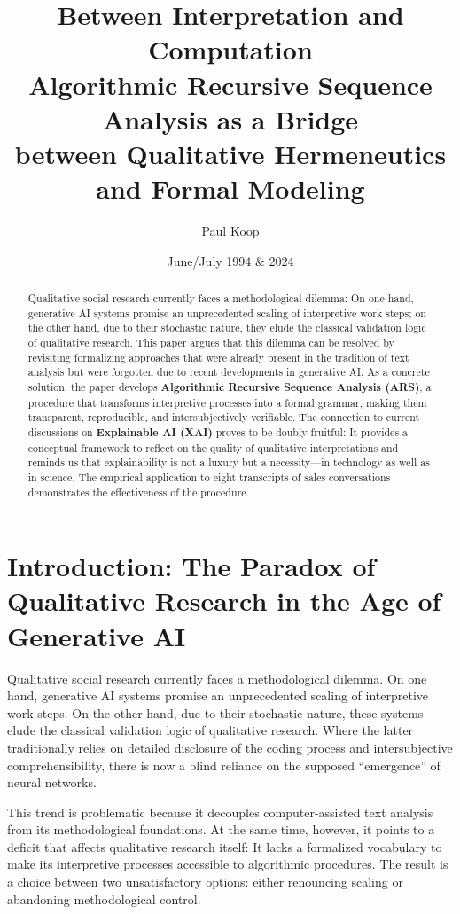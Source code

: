 \documentclass[
  12pt,
  a4paper,
  oneside,
  titlepage
]{article}
\title{\Huge\textbf{Between Interpretation and Computation} \\
       \LARGE Algorithmic Recursive Sequence Analysis as a Bridge \\
       \LARGE between Qualitative Hermeneutics and Formal Modeling}
\author{
  \large
  \begin{tabular}{c}
    Paul Koop
  \end{tabular}
}
\date{\large June/July 1994 \& 2024}
\begin{document}
\maketitle

\begin{abstract}
Qualitative social research currently faces a methodological dilemma: On one hand, 
generative AI systems promise an unprecedented scaling of interpretive work steps; 
on the other hand, due to their stochastic nature, they elude the classical validation 
logic of qualitative research. This paper argues that this dilemma can be resolved by 
revisiting formalizing approaches that were already present in the tradition of text 
analysis but were forgotten due to recent developments in generative AI. As a concrete 
solution, the paper develops \textbf{Algorithmic Recursive Sequence Analysis (ARS)}, 
a procedure that transforms interpretive processes into a formal grammar, making them 
transparent, reproducible, and intersubjectively verifiable. The connection to current 
discussions on \textbf{Explainable AI (XAI)} proves to be doubly fruitful: It provides 
a conceptual framework to reflect on the quality of qualitative interpretations and 
reminds us that explainability is not a luxury but a necessity—in technology as well 
as in science. The empirical application to eight transcripts of sales conversations 
demonstrates the effectiveness of the procedure.
\end{abstract}

\newpage
\tableofcontents
\newpage

\section{Introduction: The Paradox of Qualitative Research in the Age of Generative AI}

Qualitative social research currently faces a methodological dilemma. On one hand, 
generative AI systems promise an unprecedented scaling of interpretive work steps. 
On the other hand, due to their stochastic nature, these systems elude the classical 
validation logic of qualitative research. Where the latter traditionally relies on 
detailed disclosure of the coding process and intersubjective comprehensibility, 
there is now a blind reliance on the supposed \enquote{emergence} of neural networks.

This trend is problematic because it decouples computer-assisted text analysis from 
its methodological foundations. At the same time, however, it points to a deficit 
that affects qualitative research itself: It lacks a formalized vocabulary to make 
its interpretive processes accessible to algorithmic procedures. The result is a 
choice between two unsatisfactory options: either renouncing scaling or abandoning 
methodological control.
\end{document}
